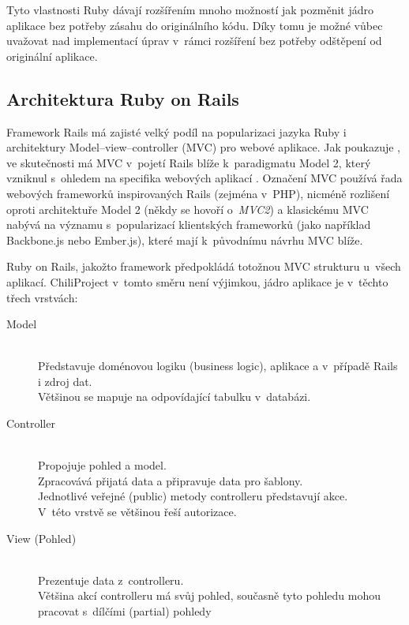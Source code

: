 \documentclass[thesis=B,czech]{FITthesis}[2012/05/02]
\begin{document}
Tyto vlastnosti Ruby dávají rozšířením mnoho možností jak pozměnit jádro
aplikace bez potřeby zásahu do originálního kódu. Díky tomu je možné
vůbec uvažovat nad implementací úprav v~rámci rozšíření bez potřeby
odštěpení od originální aplikace.

\subsection{Architektura Ruby on Rails}

Framework Rails má zajisté velký podíl na popularizaci jazyka Ruby i
architektury Model--view--controller (MVC) pro webové aplikace. Jak
poukazuje \citep{Krzywda2011}, ve skutečnosti má MVC v~pojetí Rails
blíže k~paradigmatu Model 2, který vzniknul s~ohledem na specifika
webových aplikací \citep{McCallister2004}. Označení MVC používá řada
webových frameworků inspirovaných Rails (zejména v~PHP), nicméně
rozlišení oproti architektuře Model 2 (někdy se hovoří o~\emph{MVC2}) a
klasickému MVC nabývá na významu s~popularizací klientských frameworků
(jako například Backbone.js nebo Ember.js), které mají k~původnímu
návrhu MVC blíže.

Ruby on Rails, jakožto  framework \citep[kpt. 4, Make
Opinionated Software]{Fried2009}
předpokládá totožnou MVC strukturu u~všech aplikací. ChiliProject
v~tomto směru není výjimkou, jádro aplikace je v~těchto třech vrstvách:

\begin{description}
\item[Model] \hfill \\
Představuje doménovou logiku (business logic), aplikace a v~případě Rails i zdroj dat. \hfill \\
Většinou se mapuje na odpovídající tabulku v~databázi.
\item[Controller] \hfill \\
Propojuje pohled a model. \hfill \\
Zpracovává přijatá data a připravuje data pro šablony. \hfill \\
Jednotlivé veřejné (public) metody controlleru představují akce. \hfill \\
V~této vrstvě se většinou řeší autorizace.
\item[View (Pohled)] \hfill \\
Prezentuje data z~controlleru. \hfill \\
Většina akcí controlleru má svůj pohled, současně tyto pohledu mohou pracovat s~dílčími (partial) pohledy
\end{description}
\end{document}

